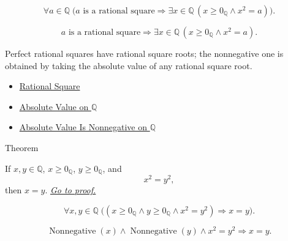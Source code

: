 \begin{remark*}
\[
\forall a\in\mathbb{Q}\;
\bigl(\text{$a$ is a rational square}
\Rightarrow
\exists x\in\mathbb{Q}\,(x\ge 0_{\mathbb{Q}}\land x^2=a)\bigr).
\]
\end{remark*}

\begin{remark*}
\[
\text{$a$ is a rational square}
\Rightarrow
\exists x\in\mathbb{Q}\,(x\ge0_{\mathbb{Q}}\land x^2=a).
\]
\end{remark*}

\begin{remark*}[Interpretation]
Perfect rational squares have rational square roots; the nonnegative one is
obtained by taking the absolute value of any rational square root.
\end{remark*}

\begin{dependencies}
\begin{itemize}
  \item \hyperref[def:rational-square]{Rational Square}
  \item \hyperref[def:absolute-value-on-q]{Absolute Value on $\mathbb{Q}$}
  \item \hyperref[thm:absolute-value-nonnegative-on-q]{Absolute Value Is Nonnegative on $\mathbb{Q}$}
\end{itemize}
\end{dependencies}

\begin{theorembox}{Theorem}
\begin{theorem}
\label{thm:uniqueness-of-nonnegative-rational-square-roots}
If $x,y\in\mathbb{Q}$, $x\ge 0_{\mathbb{Q}}$, $y\ge 0_{\mathbb{Q}}$, and
\[
x^2=y^2,
\]
then $x=y$.
\hyperref[prf:uniqueness-of-nonnegative-rational-square-roots]{\textit{Go to proof.}}
\end{theorem}
\end{theorembox}

\begin{remark*}
\[
\forall x,y\in\mathbb{Q}\;
\bigl((x\ge 0_{\mathbb{Q}}\land y\ge 0_{\mathbb{Q}}\land x^2=y^2)
\Rightarrow x=y\bigr).
\]
\end{remark*}

\begin{remark*}
\[
\operatorname{Nonnegative}(x)\land\operatorname{Nonnegative}(y)\land x^2=y^2
\Rightarrow x=y.
\]
\end{remark*}

